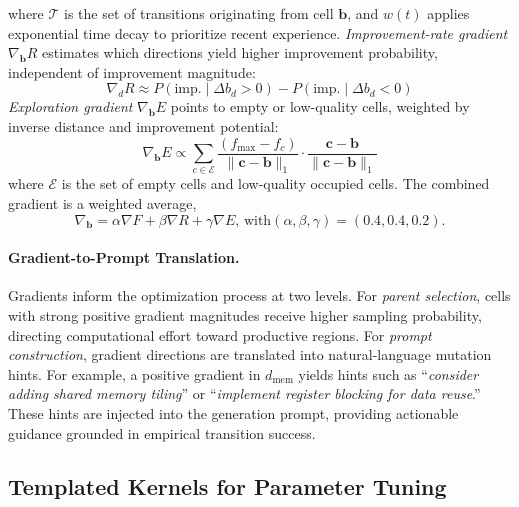 where $\mathcal{T}$ is the set of transitions originating from cell $\mathbf{b}$, and $w(t)$ applies exponential time decay to prioritize recent experience.
\textit{Improvement-rate gradient} $\nabla_\mathbf{b} R$ estimates which directions yield higher improvement probability, independent of improvement magnitude:
\begin{equation}
    \nabla_d R \approx P(\text{imp.} \mid \Delta b_d > 0) - P(\text{imp.} \mid \Delta b_d < 0)
\end{equation}
\textit{Exploration gradient} $\nabla_\mathbf{b} E$ points to empty or low-quality cells, weighted by inverse distance and improvement potential:
\begin{equation}
    \nabla_\mathbf{b} E \propto \sum_{c \in \mathcal{E}} \frac{(f_{\max} - f_c)}{\|\mathbf{c} - \mathbf{b}\|_1} \cdot \frac{\mathbf{c} - \mathbf{b}}{\|\mathbf{c} - \mathbf{b}\|_1}
\end{equation}
where $\mathcal{E}$ is the set of empty cells and low-quality occupied cells.
The combined gradient is a weighted average, 
\begin{equation}
\nabla_\mathbf{b} = \alpha \nabla F + \beta \nabla R + \gamma \nabla E,\, \text{with} (\alpha, \beta, \gamma) = (0.4, 0.4, 0.2).
\end{equation}
\paragraph{Gradient-to-Prompt Translation.}
Gradients inform the optimization process at two levels. For \textit{parent selection}, cells with strong positive gradient magnitudes receive higher sampling probability, directing computational effort toward productive regions. For \textit{prompt construction}, gradient directions are translated into natural-language mutation hints. For example, a positive gradient in $d_\text{mem}$ yields hints such as ``\textit{consider adding shared memory tiling}'' or ``\textit{implement register blocking for data reuse}.'' These hints are injected into the generation prompt, providing actionable guidance grounded in empirical transition success.


\subsection{Templated Kernels for Parameter Tuning} \label{sec:templated}

